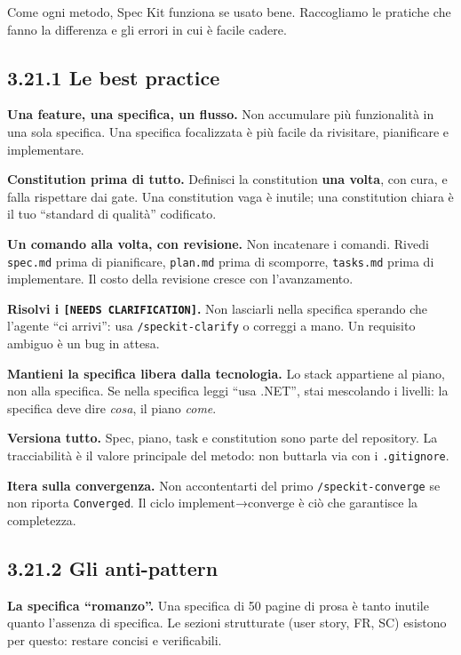 \documentclass[
  italian,
  10pt,
]{book}
\begin{document}
Come ogni metodo, Spec Kit funziona se usato bene. Raccogliamo le
pratiche che fanno la differenza e gli errori in cui è facile cadere.

\subsection{3.21.1 Le best practice}\label{le-best-practice}

\textbf{Una feature, una specifica, un flusso.} Non accumulare più
funzionalità in una sola specifica. Una specifica focalizzata è più
facile da rivisitare, pianificare e implementare.

\textbf{Constitution prima di tutto.} Definisci la constitution
\textbf{una volta}, con cura, e falla rispettare dai gate. Una
constitution vaga è inutile; una constitution chiara è il tuo ``standard
di qualità'' codificato.

\textbf{Un comando alla volta, con revisione.} Non incatenare i comandi.
Rivedi \texttt{spec.md} prima di pianificare, \texttt{plan.md} prima di
scomporre, \texttt{tasks.md} prima di implementare. Il costo della
revisione cresce con l'avanzamento.

\textbf{Risolvi i \texttt{{[}NEEDS\ CLARIFICATION{]}}.} Non lasciarli
nella specifica sperando che l'agente ``ci arrivi'': usa
\texttt{/speckit-clarify} o correggi a mano. Un requisito ambiguo è un
bug in attesa.

\textbf{Mantieni la specifica libera dalla tecnologia.} Lo stack
appartiene al piano, non alla specifica. Se nella specifica leggi ``usa
.NET'', stai mescolando i livelli: la specifica deve dire \emph{cosa},
il piano \emph{come}.

\textbf{Versiona tutto.} Spec, piano, task e constitution sono parte del
repository. La tracciabilità è il valore principale del metodo: non
buttarla via con i \texttt{.gitignore}.

\textbf{Itera sulla convergenza.} Non accontentarti del primo
\texttt{/speckit-converge} se non riporta \texttt{Converged}. Il ciclo
implement→converge è ciò che garantisce la completezza.

\subsection{3.21.2 Gli anti-pattern}\label{gli-anti-pattern}

\textbf{La specifica ``romanzo''.} Una specifica di 50 pagine di prosa è
tanto inutile quanto l'assenza di specifica. Le sezioni strutturate
(user story, FR, SC) esistono per questo: restare concisi e
verificabili.
\end{document}
